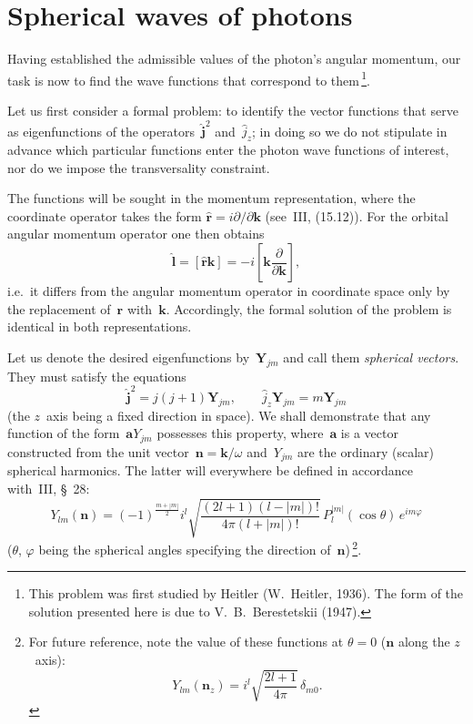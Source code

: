 \section{Spherical waves of photons}

Having established the admissible values of the photon's angular momentum, our task is now to find the wave functions that correspond to them\,\footnote{This problem was first studied by Heitler (W.~Heitler, 1936). The form of the solution presented here is due to V.~B.~Berestetskii (1947).}.

Let us first consider a formal problem: to identify the vector functions that serve as eigenfunctions of the operators~$\hat{\mathbf{j}}^2$ and~$\hat{j}_z$; in doing so we do not stipulate in advance which particular functions enter the photon wave functions of interest, nor do we impose the transversality constraint.

The functions will be sought in the momentum representation, where the coordinate operator takes the form $\hat{\mathbf{r}} = i\partial/\partial\mathbf{k}$ (see~III, (15.12)). For the orbital angular momentum operator one then obtains
\[
\hat{\mathbf{l}} = [\hat{\mathbf{r}}\mathbf{k}] = -i\left[\mathbf{k}\frac{\partial}{\partial\mathbf{k}}\right],
\]
i.e.\ it differs from the angular momentum operator in coordinate space only by the replacement of~$\mathbf{r}$ with~$\mathbf{k}$. Accordingly, the formal solution of the problem is identical in both representations.

Let us denote the desired eigenfunctions by~$\mathbf{Y}_{jm}$ and call them \emph{spherical vectors}. They must satisfy the equations
\begin{equation}
\hat{\mathbf{j}}^2 = j(j+1)\mathbf{Y}_{jm}, \qquad \hat{j}_z\mathbf{Y}_{jm} = m\mathbf{Y}_{jm}
\tag{7.1}
\end{equation}
(the $z$~axis being a fixed direction in space). We shall demonstrate that any function of the form~$\mathbf{a}Y_{jm}$ possesses this property, where~$\mathbf{a}$ is a vector constructed from the unit vector~$\mathbf{n} = \mathbf{k}/\omega$ and~$Y_{jm}$ are the ordinary (scalar) spherical harmonics. The latter will everywhere be defined in accordance with~III, \S~28:
\begin{equation}
Y_{lm}(\mathbf{n}) = (-1)^{\frac{m+|m|}{2}} i^l \sqrt{\frac{(2l+1)(l-|m|)!}{4\pi(l+|m|)!}}\,P_l^{|m|}(\cos\theta)\,e^{im\varphi}
\tag{7.2}
\end{equation}
($\theta$, $\varphi$ being the spherical angles specifying the direction of~$\mathbf{n}$)\,\footnote{For future reference, note the value of these functions at $\theta = 0$ ($\mathbf{n}$ along the $z$~axis):
\begin{equation}
Y_{lm}(\mathbf{n}_z) = i^l\sqrt{\frac{2l+1}{4\pi}}\,\delta_{m0}.
\tag{7.2a}
\end{equation}}.


